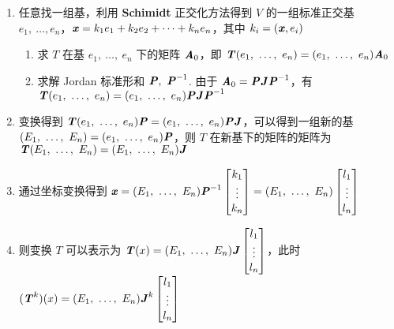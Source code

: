             \begin{enumerate}
                \item 任意找一组基，利用 \textbf{Schimidt} 正交化方法得到 $V$ 的一组标准正交基 $e_1, \ \dots, e_n$，$\textbf{\textit{x}} = k_1e_1 + k_2e_2 + \dots + k_ne_n$，其中 $k_i = (\textbf{\textit{x}}, e_i)$
                \begin{enumerate}
                    \item 求 $T$ 在基 $e_1, \ \dots, \ e_n$ 下的矩阵 $\textbf{\textit{A}}_0$，即 $\textbf{\textit{T}}(e_1, \ \dots, \ e_n) = (e_1, \ \dots, \ e_n)\textbf{\textit{A}}_0$
                    \item 求解 Jordan 标准形和 $\textbf{\textit{P}}, \ \textbf{\textit{P}}^{-1}$. 由于 $\textbf{\textit{A}}_0 = \textbf{\textit{P}}\textbf{\textit{J}}\textbf{\textit{P}}^{-1}$，有 $\textbf{\textit{T}}(e_1, \ \dots, \ e_n) = (e_1, \ \dots, \ e_n)\textbf{\textit{P}}\textbf{\textit{J}}\textbf{\textit{P}}^{-1}$
                \end{enumerate}
                \item 变换得到 $\textbf{\textit{T}}(e_1, \ \dots, \ e_n)\textbf{\textit{P}} = (e_1, \ \dots, \ e_n)\textbf{\textit{P}}\textbf{\textit{J}}$，可以得到一组新的基 $(E_1, \ \dots, \ E_n) = (e_1, \ \dots, \ e_n)\textbf{\textit{P}}$，则 $T$ 在新基下的矩阵的矩阵为 $\textbf{\textit{T}}(E_1, \ \dots, \ E_n) = (E_1, \ \dots, \ E_n)\textbf{\textit{J}}$
                \item 通过坐标变换得到 $\textbf{\textit{x}} = (E_1, \ \dots, \ E_n)\textbf{\textit{P}}^{-1}\begin{bmatrix} k_1 \\ \vdots \\ k_n \end{bmatrix} = (E_1, \ \dots, \ E_n)\begin{bmatrix} l_1 \\ \vdots \\ l_n \end{bmatrix}$
                \item 则变换 $T$ 可以表示为 $\textbf{\textit{T}}(x) = (E_1, \ \dots, \ E_n)\textbf{\textit{J}}\begin{bmatrix} l_1 \\ \vdots \\ l_n \end{bmatrix}$，此时 $(\textbf{\textit{T}}^k)(x) = (E_1, \ \dots, \ E_n)\textbf{\textit{J}}^k\begin{bmatrix} l_1 \\ \vdots \\ l_n \end{bmatrix}$
            \end{enumerate}
            
